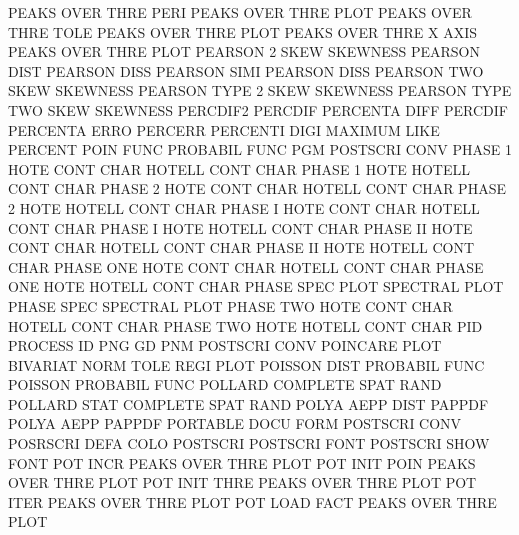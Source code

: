 PEAKS    OVER THRE PERI                 PEAKS    OVER THRE PLOT
PEAKS    OVER THRE TOLE                 PEAKS    OVER THRE PLOT
PEAKS    OVER THRE X    AXIS            PEAKS    OVER THRE PLOT
PEARSON  2    SKEW                      SKEWNESS
PEARSON  DIST                           PEARSON  DISS
PEARSON  SIMI                           PEARSON  DISS
PEARSON  TWO  SKEW                      SKEWNESS
PEARSON  TYPE 2    SKEW                 SKEWNESS
PEARSON  TYPE TWO  SKEW                 SKEWNESS
PERCDIF2                                PERCDIF
PERCENTA DIFF                           PERCDIF
PERCENTA ERRO                           PERCERR
PERCENTI DIGI                           MAXIMUM  LIKE
PERCENT  POIN FUNC                      PROBABIL FUNC
PGM                                     POSTSCRI CONV
PHASE    1    HOTE CONT CHAR            HOTELL   CONT CHAR
PHASE    1    HOTE                      HOTELL   CONT CHAR
PHASE    2    HOTE CONT CHAR            HOTELL   CONT CHAR
PHASE    2    HOTE                      HOTELL   CONT CHAR
PHASE    I    HOTE CONT CHAR            HOTELL   CONT CHAR
PHASE    I    HOTE                      HOTELL   CONT CHAR
PHASE    II   HOTE CONT CHAR            HOTELL   CONT CHAR
PHASE    II   HOTE                      HOTELL   CONT CHAR
PHASE    ONE  HOTE CONT CHAR            HOTELL   CONT CHAR
PHASE    ONE  HOTE                      HOTELL   CONT CHAR
PHASE    SPEC PLOT                      SPECTRAL PLOT
PHASE    SPEC                           SPECTRAL PLOT
PHASE    TWO  HOTE CONT CHAR            HOTELL   CONT CHAR
PHASE    TWO  HOTE                      HOTELL   CONT CHAR
PID                                     PROCESS  ID
PNG                                     GD
PNM                                     POSTSCRI CONV
POINCARE PLOT                           BIVARIAT NORM TOLE REGI PLOT
POISSON  DIST                           PROBABIL FUNC
POISSON                                 PROBABIL FUNC
POLLARD                                 COMPLETE SPAT RAND
POLLARD  STAT                           COMPLETE SPAT RAND
POLYA    AEPP DIST                      PAPPDF
POLYA    AEPP                           PAPPDF
PORTABLE DOCU FORM                      POSTSCRI CONV
POSRSCRI DEFA COLO                      POSTSCRI
POSTSCRI FONT                           POSTSCRI SHOW FONT
POT      INCR                           PEAKS    OVER THRE PLOT
POT      INIT POIN                      PEAKS    OVER THRE PLOT
POT      INIT THRE                      PEAKS    OVER THRE PLOT
POT      ITER                           PEAKS    OVER THRE PLOT
POT      LOAD FACT                      PEAKS    OVER THRE PLOT
